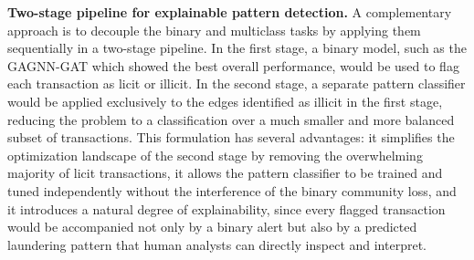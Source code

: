 \textbf{Two-stage pipeline for explainable pattern detection.}
A complementary approach is to decouple the binary and multiclass tasks by applying them sequentially in a two-stage pipeline. In the first stage, a binary model, such as the GAGNN-GAT which showed the best overall performance, would be used to flag each transaction as licit or illicit. In the second stage, a separate pattern classifier would be applied exclusively to the edges identified as illicit in the first stage, reducing the problem to a classification over a much smaller and more balanced subset of transactions. This formulation has several advantages: it simplifies the optimization landscape of the second stage by removing the overwhelming majority of licit transactions, it allows the pattern classifier to be trained and tuned independently without the interference of the binary community loss, and it introduces a natural degree of explainability, since every flagged transaction would be accompanied not only by a binary alert but also by a predicted laundering pattern that human analysts can directly inspect and interpret.

